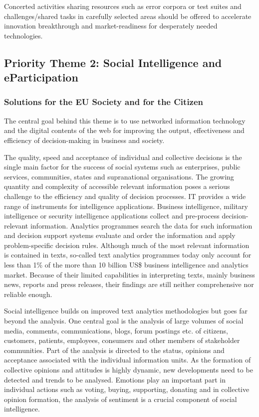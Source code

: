 \documentclass[10pt, plain]{../../metanetpaper}
\begin{document}
\begin{multicols}{2}
Concerted activities sharing resources such as error corpora or test suites and challenges/shared tasks in carefully selected areas should be offered to accelerate innovation breakthrough and market-readiness for desperately needed technologies.

\subsection{Priority Theme 2: Social Intelligence and eParticipation}
\label{sec:priority-theme-2-social-intelligence}

\subsubsection{Solutions for the EU Society and for the Citizen}
\label{sec:solutions-eu-society-pt2}

The central goal behind this theme is to use networked information technology and the digital contents of the web for improving the output, effectiveness and efficiency of decision-making in business and society. 
 
The quality, speed and acceptance of individual and collective decisions is the single main factor for the success of social systems such as enterprises, public services, communities, states and supranational organisations. The growing quantity and complexity of accessible relevant information poses a serious challenge to the efficiency and quality of decision processes. IT provides a wide range of instruments for intelligence applications. Business intelligence, military intelligence or security intelligence applications collect and pre-process decision-relevant information. Analytics programmes search the data for such information and decision support systems evaluate and order the information and apply problem-specific decision rules. Although much of the most relevant information is contained in texts, so-called text analytics programmes today only account for less than 1\% of the more than 10 billion US\$ business intelligence and analytics market. Because of their limited capabilities in interpreting texts, mainly business news, reports and press releases, their findings are still neither comprehensive nor reliable enough.
 
Social intelligence builds on improved text analytics methodologies but  goes far beyond the analysis. One central goal is the analysis of large volumes of social media, comments, communications, blogs, forum postings etc. of citizens, customers, patients, employees, consumers and other members of stakeholder communities. Part of the analysis is directed to the status, opinions and acceptance associated with the individual information units. As the formation of collective opinions and attitudes is highly dynamic, new developments need to be detected and trends to be analysed. Emotions play an important part in individual actions such as voting, buying, supporting, donating and in collective opinion formation, the analysis of sentiment is a crucial component of social intelligence.  
 

\end{multicols}
\end{document}
